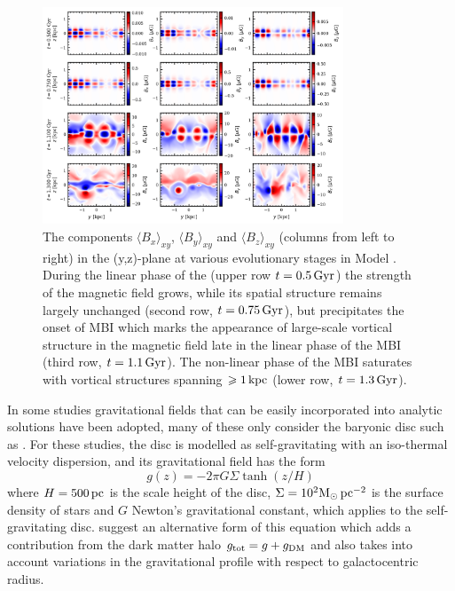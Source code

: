 \documentclass[fleqn,usenatbib]{mnras}
\newcommand{\RSOBSD}{{\sf{O60q0.3}}}
\newcommand{\p}{\,{\rm pc}}     %
\newcommand{\kpc}{\,{\rm kpc}}  %
\newcommand{\Gyr}{\,{\rm Gyr}}  %
\begin{document}
\begin{figure}
    \centering
    \includegraphics[width=0.8\textwidth]{magnetic_field_evolution.png}
    \caption{The components $\langle B_x\rangle_{xy}$, $\langle
B_y\rangle_{xy}$ and $\langle B_z\rangle_{xy}$ (columns from left to right) in
the (y,z)-plane at various evolutionary stages in Model \RSOBSD.  During the
{linear phase of the (upper row $t = 0.5\Gyr$)} the strength of the magnetic
field grows, while its spatial structure remains largely unchanged (second row,
$t=0.75\Gyr$){, but precipitates the onset of MBI} which  marks the
appearance of large-scale vortical structure in the magnetic field {late in
the linear phase of the MBI} (third row, $t = 1.1\Gyr$). {The non-linear
phase of the MBI saturates with vortical structures spanning $\geq1\kpc$}
(lower row, $t=1.3\Gyr$).  }
    \label{fig:field_evolution}
\end{figure}

In some studies gravitational fields that can be easily incorporated into
analytic solutions have been adopted, many of these only consider the baryonic
disc such as \citet{Giz1993,Luiz_R_2015a}. For these studies, the disc is
modelled as self-gravitating with an iso-thermal velocity dispersion, and its
gravitational field has the form
\begin{equation}
    g(z) = -2\pi G\Sigma \tanh(z/H)
\end{equation}
where $H=500\p$ is the scale height of the disc,
$\Sigma=10^2\rm{M}_{\odot}\p^{-2}$ is the surface density of stars and $G$
Newton's gravitational constant, which applies to the self-gravitating disc.
\citet{LBO2017} suggest an alternative form of this equation which adds a
contribution from the dark matter halo $g_{\rm tot}=g+g_{\rm DM}$ and also
takes into account variations in the gravitational profile with respect to
galactocentric radius.
\end{document}
